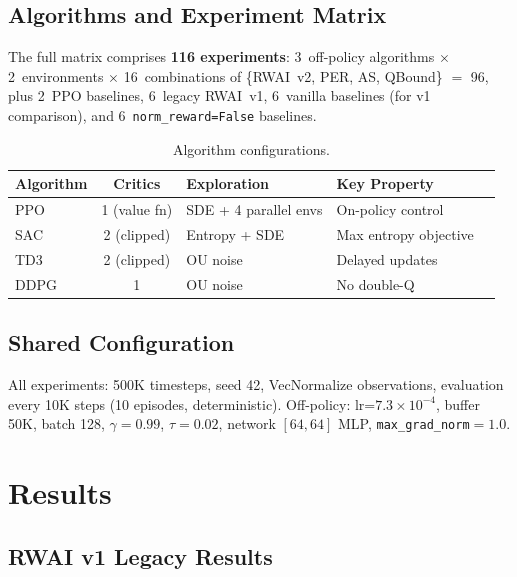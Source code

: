 \documentclass[11pt,a4paper]{article}
\begin{document}
\subsection{Algorithms and Experiment Matrix}

The full matrix comprises \textbf{116 experiments}: 3~off-policy algorithms $\times$ 2~environments $\times$ 16~combinations of \{RWAI~v2, PER, AS, QBound\} $=$ 96, plus 2~PPO baselines, 6~legacy RWAI~v1, 6~vanilla baselines (for v1 comparison), and 6~\texttt{norm\_reward=False} baselines.

\begin{table}[h]
\centering
\caption{Algorithm configurations.}
\begin{tabular}{lclll}
\toprule
Algorithm & Critics & Exploration & Key Property \\
\midrule
PPO & 1 (value fn) & SDE + 4 parallel envs & On-policy control \\
SAC & 2 (clipped) & Entropy + SDE & Max entropy objective \\
TD3 & 2 (clipped) & OU noise & Delayed updates \\
DDPG & 1 & OU noise & No double-Q \\
\bottomrule
\end{tabular}
\end{table}

\subsection{Shared Configuration}

All experiments: 500K timesteps, seed 42, VecNormalize observations, evaluation every 10K steps (10 episodes, deterministic). Off-policy: lr=$7.3 \times 10^{-4}$, buffer 50K, batch 128, $\gamma=0.99$, $\tau=0.02$, network $[64, 64]$ MLP, \texttt{max\_grad\_norm}$=1.0$.

\section{Results}

\subsection{RWAI v1 Legacy Results}
\end{document}
